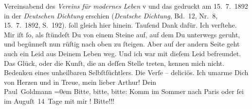 \begin{ledgroupsized}[t]{13cm}
{{{                  Vereinsabend des \emph{Vereins für modernes Leben} v
                  und das gedruckt am 15. 7. 1892 in der \emph{Deutschen Dichtung} erschien (\emph{Deutsche Dichtung}, Bd. 12, Nr. 8,
                        15. 7. 1892, S. 192).}}}\label{K_L02697-h} ſoll gleich hier hinein.
               Tauſend Dank dafür. Ich verſtehe. Mir iſt ſo, als ſtündeſt Du von einem Steine auf,
               auf dem Du unterwegs geruht, und begünneſt nun rüſtig nach oben zu ſteigen. Aber auf
               der andern Seite geht auch ein  Leid aus Deinem
               Leben weg. Und ich war mit dieſem Leid befreundet. Das Glück, oder die Kunſt, die an
               deſſen Stelle treten, kennen mich nicht. Bedenken eines unheilbaren
               Selbſtſüchtlers.\pend
           \pstart
           Die Verſe – deliciös.\pend
           \pstart
           Ich umarme Dich von Herzen und in Treue, mein lieber Arthur!\pend
           \pstart
           Dein {\\[\baselineskip]}\spacefill\mbox{Paul Goldmann}\pend
           \leftskip=0em{}\pstart
           \noindent{}{\pb}Bitte, bitte, bitte: Komm im Sommer nach Paris oder ſei im Auguſt 14 Tage mit mir \label{K_L02697-1v}\label{K_L02697-1h}! Bitte!!!\pend
           \endnumbering{}\end{ledgroupsized}  \newcommand{\dateiname}{L02697}\newcommand{\titel}{Paul Goldmann an Arthur Schnitzler, 23. 4. [1892]}\newcommand{\editorInnen}{Martin Anton Müller und Laura Untner}
      
